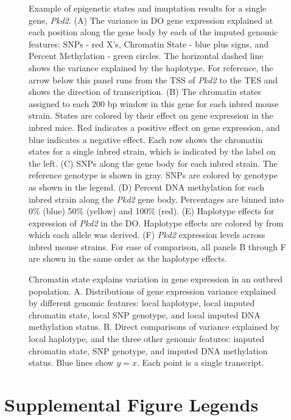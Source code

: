 \documentclass[10pt,letterpaper]{article}
\begin{document}
\begin{figure}[ht]
\centering
\caption{Example of epigenetic states and imuptation results for a single 
gene, \textit{Pkd2}. (A) The variance in DO gene expression explained at 
each position along the gene body by each of the imputed genomic 
features: SNPs - red X's, Chromatin State - blue plus signs, and 
Percent Methylation - green circles. The horizontal dashed line shows 
the variance explained by the haplotype. For reference, the arrow 
below this panel runs from the TSS of \textit{Pkd2} to the TES and 
shows the direction of transcription. (B) The chromatin states assigned 
to each 200 bp window in this gene for each inbred mouse strain. States 
are colored by their effect on gene expression in the inbred mice. Red 
indicates a positive effect on gene expression, and blue indicates a 
negative effect. Each row shows the chromatin states for a single inbred 
strain, which is indicated by the label on the left. (C) SNPs along the 
gene body for each inbred strain. The reference genotype is shown in gray. 
SNPs are colored by genotype as shown in the legend. (D) Percent DNA 
methylation for each inbred strain along the \textit{Pkd2} gene body. 
Percentages are binned into 0\% (blue) 50\% (yellow) and 100\% (red). 
(E) Haplotype effects for expression of \textit{Pkd2} in the DO. 
Haplotype effects are colored by from which each allele was derived. 
(F) \textit{Pkd2} expression levels across inbred mouse strains. For 
ease of comparison, all panels B through F are shown in the same order 
as the haplotype effects.}
\label{fig:example_gene}
\end{figure}

\begin{figure}[ht]
\centering
\caption{Chromatin state explains variation in gene expression in an outbred 
population. A. Distributions of gene expression variance explained by different 
genomic features: local haplotype, local imputed chromatin state, local SNP 
genotype, and local imputed DNA methylation status. B. Direct comparisons of 
variance explained by local haplotype, and the three other genomic features: 
imputed chromatin state, SNP genotype, and imputed DNA methylation status. 
Blue lines show $y = x$. Each point is a single transcript.}
\label{fig:effect_distrubutions}
\end{figure}

\pagebreak

\hypertarget{supplemental-figure-legends}{%
\section{Supplemental Figure
Legends}\label{supplemental-figure-legends}}
\end{document}
